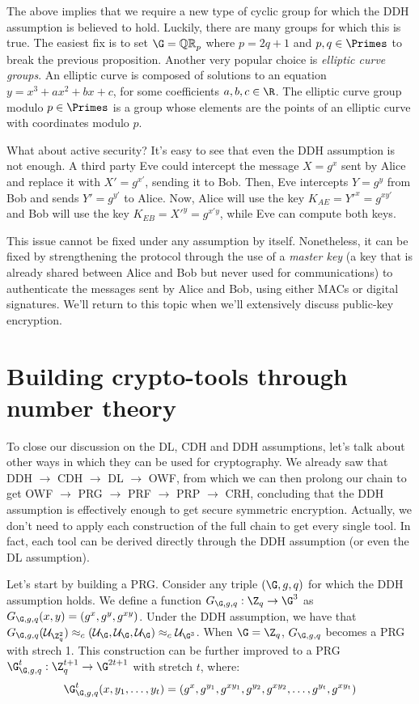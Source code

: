 \documentclass[a4paper, 12pt]{report}
\begin{document}
    The above implies that we require a new type of cyclic group for which the DDH assumption is believed to hold. Luckily, there are many groups for which this is true. The easiest fix is to set $\G = \mathbb{QR}_{p}$ where $p = 2q+1$ and $p,q \in \Primes$ to break the previous proposition. Another very popular choice is \textit{elliptic curve groups}. An elliptic curve is composed of solutions to an equation $y = x^3 + ax^2+bx+c$, for some coefficients $a,b,c \in \R$. The elliptic curve group modulo $p \in \Primes$ is a group whose elements are the points of an elliptic curve with coordinates modulo $p$.

    What about active security? It's easy to see that even the DDH assumption is not enough. A third party Eve could intercept the message $X = g^x$ sent by Alice and replace it with $X' = g^{x'}$, sending it to Bob. Then, Eve intercepts $Y = g^y$ from Bob and sends $Y' = g^{y'}$ to Alice. Now, Alice will use the key $K_{AE} = Y'^{x} = g^{xy'}$ and Bob will use the key $K_{EB} = X'^{y} = g^{x'y}$, while Eve can compute both keys.

    This issue cannot be fixed under any assumption by itself. Nonetheless, it can be fixed by strengthening the protocol through the use of a \textit{master key} (a key that is already shared between Alice and Bob but never used for communications) to authenticate the messages sent by Alice and Bob, using either MACs or digital signatures. We'll return to this topic when we'll extensively discuss public-key encryption.

    \section{Building crypto-tools through number theory}

    To close our discussion on the DL, CDH and DDH assumptions, let's talk about other ways in which they can be used for cryptography. We already saw that DDH $\to$ CDH $\to$ DL $\to$ OWF, from which we can then prolong our chain to get OWF $\to$ PRG $\to$ PRF $\to$ PRP $\to$ CRH, concluding that the DDH assumption is effectively enough to get secure symmetric encryption. Actually, we don't need to apply each construction of the full chain to get every single tool. In fact, each tool can be derived directly through the DDH assumption (or even the DL assumption).
    
    Let's start by building a PRG. Consider any triple $(\G,g,q)$ for which the DDH assumption holds. We define a function $G_{\G,g,q} : \Z_q \to \G^3$ as $G_{\G,g,q}(x,y) = (g^x, g^y, g^{xy})$. Under the DDH assumption, we have that $G_{\G,g,q}(\mathcal{U}_{\Z_q^2}) \approx_c (\mathcal{U}_{\G}, \mathcal{U}_{\G}, \mathcal{U}_{\G}) \approx_c \mathcal{U}_{\G^3}$. When $\G = \Z_q$, $G_{\G,g,q}$ becomes a PRG with strech 1. This construction can be further improved to a PRG $\G^t_{\G,g,q} : \Z_q^{t+1} \to \G^{2t+1}$ with stretch $t$, where:
    \[\G^t_{\G,g,q}(x, y_1, \ldots, y_t) = (g^x, g^{y_1}, g^{xy_1}, g^{y_2}, g^{xy_2}, \ldots, g^{y_t}, g^{xy_t})\]
\end{document}
